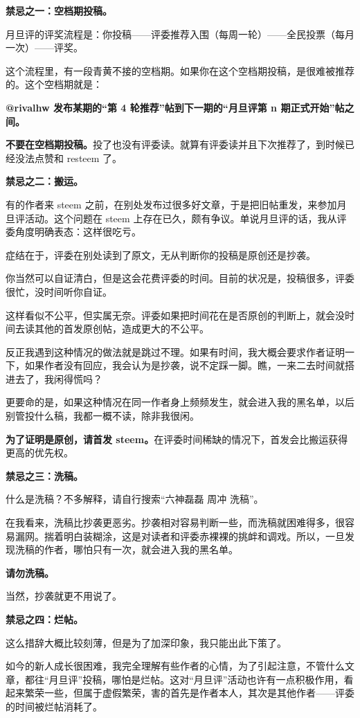 \documentclass[]{ctexbook}
\begin{document}
\textbf{禁忌之一：空档期投稿。}

月旦评的评奖流程是：你投稿------评委推荐入围（每周一轮）------全民投票（每月一次）------评奖。

这个流程里，有一段青黄不接的空档期。如果你在这个空档期投稿，是很难被推荐的。这个空档期就是：

\textbf{@rivalhw 发布某期的``第 4 轮推荐''帖到下一期的``月旦评第 n 期正式开始''帖之间。}

\textbf{不要在空档期投稿。}投了也没有评委读。就算有评委读并且下次推荐了，到时候已经没法点赞和 resteem 了。

\textbf{禁忌之二：搬运。}

有的作者来 steem 之前，在别处发布过很多好文章，于是把旧帖重发，来参加月旦评活动。这个问题在 steem 上存在已久，颇有争议。单说月旦评的话，我从评委角度明确表态：这样很吃亏。

症结在于，评委在别处读到了原文，无从判断你的投稿是原创还是抄袭。

你当然可以自证清白，但是这会花费评委的时间。目前的状况是，投稿很多，评委很忙，没时间听你自证。

这样看似不公平，但实属无奈。评委如果把时间花在是否原创的判断上，就会没时间去读其他的首发原创帖，造成更大的不公平。

反正我遇到这种情况的做法就是跳过不理。如果有时间，我大概会要求作者证明一下，如果作者没有回应，我会认为是抄袭，说不定踩一脚。瞧，一来二去时间就搭进去了，我闲得慌吗？

更要命的是，如果这种情况在同一作者身上频频发生，就会进入我的黑名单，以后别管投什么稿，我都一概不读，除非我很闲。

\textbf{为了证明是原创，请首发 steem。}在评委时间稀缺的情况下，首发会比搬运获得更高的优先权。

\textbf{禁忌之三：洗稿。}

什么是洗稿？不多解释，请自行搜索``六神磊磊 周冲 洗稿''。

在我看来，洗稿比抄袭更恶劣。抄袭相对容易判断一些，而洗稿就困难得多，很容易漏网。揣着明白装糊涂，这是对读者和评委赤裸裸的挑衅和调戏。所以，一旦发现洗稿的作者，哪怕只有一次，就会进入我的黑名单。

\textbf{请勿洗稿。}

当然，抄袭就更不用说了。

\textbf{禁忌之四：烂帖。}

这么措辞大概比较刻薄，但是为了加深印象，我只能出此下策了。

如今的新人成长很困难，我完全理解有些作者的心情，为了引起注意，不管什么文章，都往``月旦评''投稿，哪怕是烂帖。这对``月旦评''活动也许有一点积极作用，看起来繁荣一些，但属于虚假繁荣，害的首先是作者本人，其次是其他作者------评委的时间被烂帖消耗了。
\end{document}
